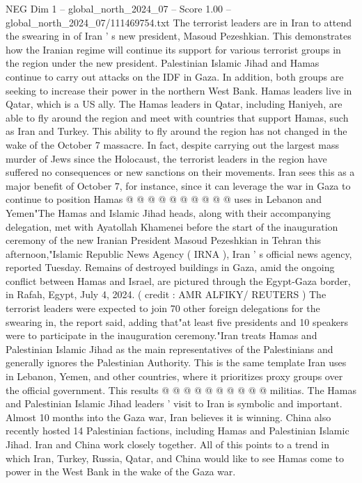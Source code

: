 \begin{textsample}{NEG Dim 1 – global\_north\_2024\_07 – Score 1.00 – global\_north\_2024\_07/111469754.txt}  \label{ex:f1_neg_065}
The terrorist leaders are in Iran to attend the swearing in of Iran ' s new president, Masoud Pezeshkian.
This demonstrates how the Iranian regime will continue its support for various terrorist groups in the region under the new president.
Palestinian Islamic Jihad and Hamas continue to carry out attacks on the IDF in Gaza.
In addition, both groups are seeking to increase their power in the northern West Bank.
Hamas leaders live in Qatar, which is a US ally.
The Hamas leaders in Qatar, including Haniyeh, are able to fly around the region and meet with countries that support Hamas, such as Iran and Turkey.
This ability to fly around the region has not changed in the wake of the October 7 massacre.
In fact, despite carrying out the largest mass murder of Jews since the Holocaust, the terrorist leaders in the region have suffered no consequences or new sanctions on their movements.
Iran sees this as a major benefit of October 7, for instance, since it can leverage the war in Gaza to continue to position Hamas @ @ @ @ @ @ @ @ @ @ uses in Lebanon and Yemen"The Hamas and Islamic Jihad heads, along with their accompanying delegation, met with Ayatollah Khamenei before the start of the inauguration ceremony of the new Iranian President Masoud Pezeshkian in Tehran this afternoon,"Islamic Republic News Agency ( IRNA ), Iran ' s official news agency, reported Tuesday.
Remains of destroyed buildings in Gaza, amid the ongoing conflict between Hamas and Israel, are pictured through the Egypt-Gaza border, in Rafah, Egypt, July 4, 2024. ( credit : AMR ALFIKY/ REUTERS ) The terrorist leaders were expected to join 70 other foreign delegations for the swearing in, the report said, adding that"at least five presidents and 10 speakers were to participate in the inauguration ceremony."Iran treats Hamas and Palestinian Islamic Jihad as the main representatives of the Palestinians and generally ignores the Palestinian Authority.
This is the same template Iran uses in Lebanon, Yemen, and other countries, where it prioritizes proxy groups over the official government.
This results @ @ @ @ @ @ @ @ @ @ militias.
The Hamas and Palestinian Islamic Jihad leaders ' visit to Iran is symbolic and important.
Almost 10 months into the Gaza war, Iran believes it is winning.
China also recently hosted 14 Palestinian factions, including Hamas and Palestinian Islamic Jihad.
Iran and China work closely together.
All of this points to a trend in which Iran, Turkey, Russia, Qatar, and China would like to see Hamas come to power in the West Bank in the wake of the Gaza war.

\end{textsample}
